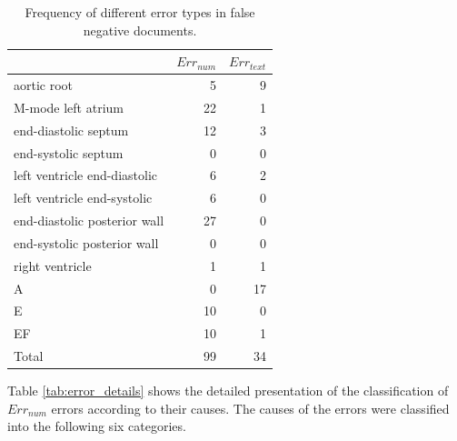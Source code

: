 \begin{table}[h]
	\caption{Frequency of different error types in false negative documents. %
	}
	\label{tab:number_of_errors}
	\centering
	\begin{tabular}{ lrr }
		\toprule
		                             & $Err_{num}$ & $Err_{text}$ \\
		\midrule
		aortic root                  & 5           & 9            \\
		M-mode left atrium           & 22          & 1            \\
		end-diastolic septum         & 12          & 3            \\
		end-systolic septum          & 0           & 0            \\
		left ventricle end-diastolic & 6           & 2            \\
		left ventricle end-systolic  & 6           & 0            \\
		end-diastolic posterior wall & 27          & 0            \\
		end-systolic posterior wall  & 0           & 0            \\
		right ventricle              & 1           & 1            \\
		A                            & 0           & 17           \\
		E                            & 10          & 0            \\
		EF                           & 10          & 1            \\
		\midrule
		Total                        & 99          & 34           \\
		\bottomrule
	\end{tabular}
\end{table}

Table \ref{tab:error_details} shows the detailed presentation of the classification of $Err_{num}$ errors according to their causes. The causes of the errors were classified into the following six categories.

